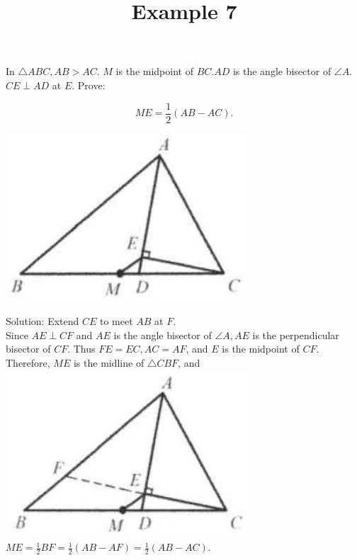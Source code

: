 \documentclass{article}
\title{Example 7}
\date{}
\begin{document}
\maketitle

In \(\triangle A B C, A B>A C\). \(M\) is the midpoint of \(B C . A D\) is the angle bisector of \(\angle A\). \(C E \perp A D\) at \(E\). Prove:

\[
M E=\frac{1}{2}(A B-A C) .
\]

\begin{center}
\includegraphics[width=\textwidth]{images/problem_image_1.jpg}
\end{center}


Solution:
Extend \(C E\) to meet \(A B\) at \(F\).\\
Since \(A E \perp C F\) and \(A E\) is the angle bisector of \(\angle A, A E\) is the perpendicular bisector of \(C F\). Thus \(F E=E C, A C=A F\), and \(E\) is the midpoint of \(C F\).\\
Therefore, \(M E\) is the midline of \(\triangle C B F\), and\\
\centering
\includegraphics[width=\textwidth]{images/reasoning_image_1.jpg}\\
\(M E=\frac{1}{2} B F=\frac{1}{2}(A B-A F)=\frac{1}{2}(A B-A C)\).
\end{document}
